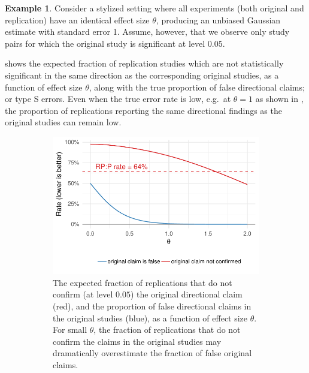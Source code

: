 \documentclass[aoas, preprint]{imsart}
\theoremstyle{definition}
\newtheorem{example}{Example}
\theoremstyle{custom}
\begin{document}
  \begin{example}
    \label{eg:sel-bias}
    Consider a stylized setting where all experiments (both original and replication) have an identical effect size $\theta$, producing an unbiased Gaussian estimate with standard error 1. Assume, however, that we observe only study pairs for which the original study is significant at level $0.05$.

     shows the expected fraction of replication studies which are not statistically significant in the same direction as the corresponding original studies, as a function of effect size $\theta$, along with the true proportion of false directional claims; or type S errors. Even when the true error rate is low, e.g.\ at $\theta = 1$ as shown in , the proportion of replications reporting the same directional findings as the original studies can remain low.
    \begin{figure}[htbp]
	    \centering
	    \begin{subfigure}[t]{0.59\hsize}
	      \centering
	      \includegraphics[width=\hsize]{naive-same-dir}
	      \caption{The expected fraction of replications that do not confirm (at level $0.05$) the original directional claim (red), and the proportion of false directional claims in the original studies (blue), as a function of effect size $\theta$. For small $\theta$, the fraction of replications that do not confirm the claims in the original studies may dramatically overestimate the fraction of false original claims.}
	    \label{fig:naive-same-dir-func}
	    \end{subfigure}
	    \hfill
	    \begin{subfigure}[t]{0.39\hsize}

\end{subfigure}
\end{figure}
\end{example}
\end{document}
